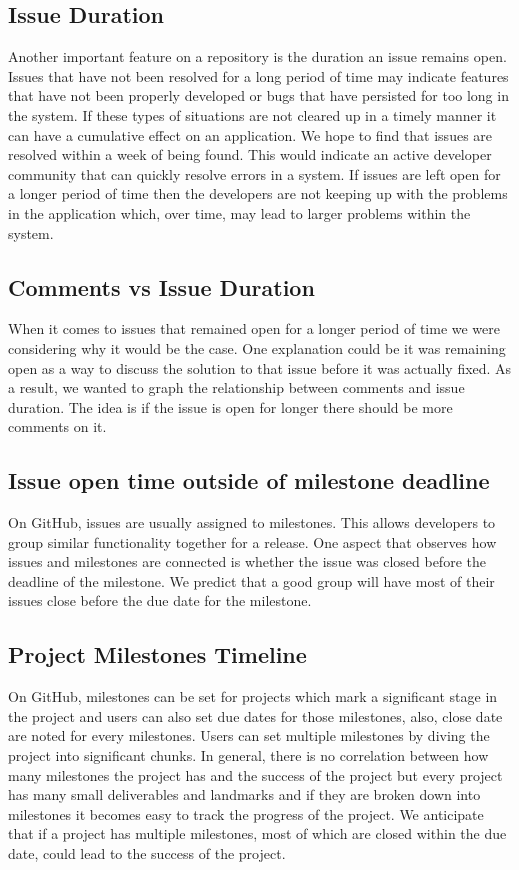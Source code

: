 \documentclass[conference]{IEEEtran}
\begin{document}
\subsection{Issue Duration}
Another important feature on a repository is the duration an issue remains open. Issues that have not been resolved for a long period of time may indicate features that have not been properly developed or bugs that have persisted for too long in the system. If these types of situations are not cleared up in a timely manner it can have a cumulative effect on an application. We hope to find that issues are resolved within a week of being found. This would indicate an active developer community that can quickly resolve errors in a system. If issues are left open for a longer period of time then the developers are not keeping up with the problems in the application which, over time, may lead to larger problems within the system. 

\subsection{Comments vs Issue Duration}
When it comes to issues that remained open for a longer period of time we were considering why it would be the case. One explanation could be it was remaining open as a way to discuss the solution to that issue before it was actually fixed. As a result, we wanted to graph the relationship between comments and issue duration. The idea is if the issue is open for longer there should be more comments on it. 

\subsection{Issue open time outside of milestone deadline}
On GitHub, issues are usually assigned to milestones. This allows developers to group similar functionality together for a release. One aspect that observes how issues and milestones are connected is whether the issue was closed before the deadline of the milestone. We predict that a good group will have most of their issues close before the due date for the milestone. 

\subsection{Project Milestones Timeline}
On GitHub, milestones can be set for projects which mark a significant stage in the project and users can also set due dates for those milestones, also, close date are noted for every milestones. Users can set multiple milestones by diving the project into significant chunks. In general, there is no correlation between how many milestones the project has and the success of the project but every project has many small deliverables and landmarks and if they are broken down into milestones it becomes easy to track the progress of the project. We anticipate that if a project has multiple milestones, most of which are closed within the due date, could lead to the success of the project.
\end{document}
